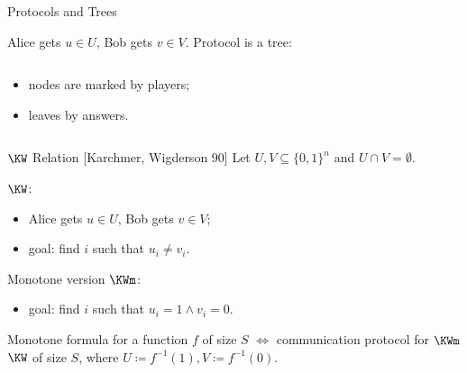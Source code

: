 \begin{frame}{Protocols and Trees}

    Alice gets $u \in U$, Bob gets $v \in V$. Protocol is a tree:

    \begin{columns}[t]
		\begin{column}{0.7\textwidth}
            \begin{itemize}
                \item<2-> nodes are marked by players;
    		    \item<7-> leaves by answers.
	        \end{itemize}

        \end{column}
        
		\begin{column}{0.25\textwidth}
            
		\end{column}
	\end{columns}

\end{frame}

\begin{frame}{$\KW$ Relation [Karchmer, Wigderson 90]}
    Let $U, V \subseteq \{0, 1\}^{n}$ and $U \cap V = \emptyset$.

    \vspace{0.1cm}
    $\KW$:
    \begin{itemize}
        \item Alice gets $u \in U$, Bob gets $v \in V$;
        \item goal: find $i$ such that $u_i \neq v_i$.
    \end{itemize}
    \pause
    Monotone version $\KWm$:
    \begin{itemize}
        \item goal: find $i$ such that $u_i = 1 \land v_i = 0$.
    \end{itemize}

    \pause

    \begin{theorem}
        \alert{Monotone} formula for a function $f$ of size $S$ $\Leftrightarrow$ communication protocol
        for \alert{$\KWm$} $\KW$ of size $S$, where $U \coloneqq f^{-1}(1), V \coloneqq f^{-1}(0)$.
    \end{theorem}
\end{frame}


